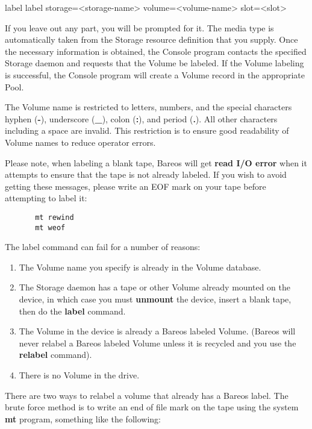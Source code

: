 \begin{description}
\begin{bconsole}{label}
label storage=<storage-name> volume=<volume-name> slot=<slot>
\end{bconsole}

   If you leave out any part, you will be prompted for it.  The media type
   is automatically taken from the Storage resource definition that you
   supply.  Once the necessary information is obtained, the Console program
   contacts the specified Storage daemon and requests that the Volume be
   labeled.  If the Volume labeling is successful, the Console program will
   create a Volume record in the appropriate Pool.

   The Volume name is restricted to letters, numbers, and the special
   characters hyphen ({\bf -}), underscore ({\bf \_}), colon ({\bf :}), and
   period ({\bf .}).  All other characters including a space are invalid.
   This restriction is to ensure good readability of Volume names to reduce
   operator errors.

   Please note, when labeling a blank tape, Bareos will get {\bf read I/O
   error} when it attempts to ensure that the tape is not already labeled.  If
   you wish to avoid getting these messages, please write an EOF mark on
   your tape before attempting to label it:

\footnotesize
\begin{verbatim}
       mt rewind
       mt weof
\end{verbatim}
\normalsize


The label command can fail for a number of reasons:

\begin{enumerate}
\item The Volume name you specify is already in the  Volume database.

\item The Storage daemon has a tape or other Volume already mounted on the
   device, in which case you must {\bf unmount} the device, insert a blank
   tape, then do the {\bf label} command.

\item The Volume in the device is already a Bareos labeled Volume.  (Bareos will
   never relabel a Bareos labeled Volume unless it is recycled and you use the
   {\bf relabel} command).

\item There is no Volume in the drive.
\end{enumerate}

There are two ways to relabel a volume that already has a Bareos label. The
brute  force method is to write an end of file mark on the tape  using the
system {\bf mt} program, something like the  following:


\end{description}
